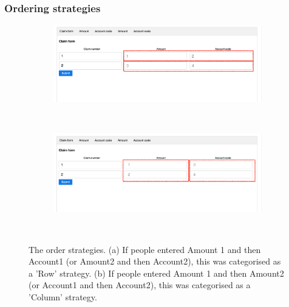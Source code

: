 \begin{table}
\begin{enumerate}
\subsubsection{Ordering strategies}
\begin{figure}[!ht]
    \centering
    \begin{subfigure}[b]{0.5\textwidth}
        \includegraphics[width=\textwidth]{images/Study4/ch34_4-roworderstr.png}
        \caption{}
        \label{fig:ch34_4-roworderstr}
    \end{subfigure}
    ~ %
    \begin{subfigure}[b]{0.5\textwidth}
        \includegraphics[width=\textwidth]{images/Study4/ch34_4-columnorderstr.png}
        \caption{}
        \label{fig:columnorderstr}
    \end{subfigure}
    ~ %
    \caption{The order strategies. (a)  If people entered Amount 1 and then Account1 (or Amount2 and then Account2), this was categorised as a 'Row' strategy. (b) If people entered Amount 1 and then Amount2 (or Account1 and then Account2), this was categorised as a 'Column' strategy.}\label{fig:ch34_4-orderstr}
\end{figure}



\end{enumerate}
\end{table}
